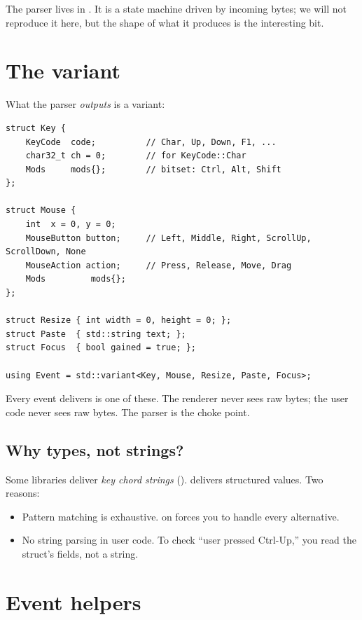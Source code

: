 The parser lives in . It is a
state machine driven by incoming bytes; we will not reproduce it
here, but the shape of what it produces is the interesting bit.

\section{The  variant}

What the parser \emph{outputs} is a variant:

\begin{lstlisting}
struct Key {
    KeyCode  code;          // Char, Up, Down, F1, ...
    char32_t ch = 0;        // for KeyCode::Char
    Mods     mods{};        // bitset: Ctrl, Alt, Shift
};

struct Mouse {
    int  x = 0, y = 0;
    MouseButton button;     // Left, Middle, Right, ScrollUp, ScrollDown, None
    MouseAction action;     // Press, Release, Move, Drag
    Mods         mods{};
};

struct Resize { int width = 0, height = 0; };
struct Paste  { std::string text; };
struct Focus  { bool gained = true; };

using Event = std::variant<Key, Mouse, Resize, Paste, Focus>;
\end{lstlisting}

Every event \maya{} delivers is one of these. The renderer never sees
raw bytes; the user code never sees raw bytes. The parser is the
choke point.

\subsection{Why types, not strings?}

Some libraries deliver \emph{key chord strings} ().
\maya{} delivers structured values. Two reasons:

\begin{itemize}[leftmargin=*]
  \item Pattern matching is exhaustive.  on
     forces you to handle every alternative.
  \item No string parsing in user code. To check ``user pressed
    Ctrl-Up,'' you read the  struct's fields, not a
    string.
\end{itemize}

\section{Event helpers}


